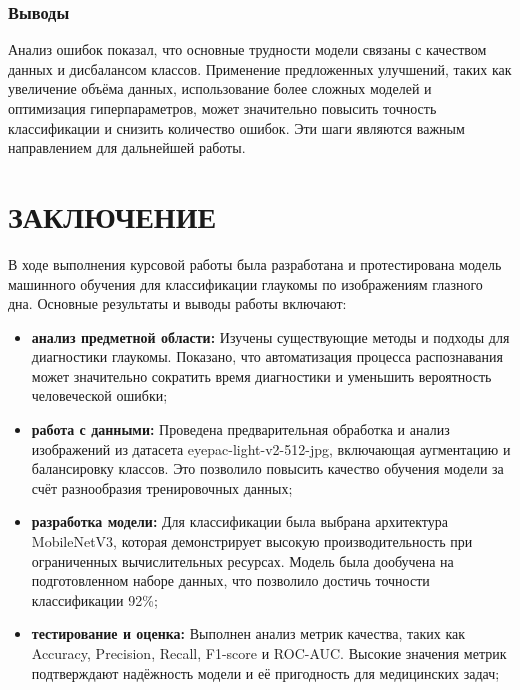 {    \subsubsection*{Выводы}

    Анализ ошибок показал, что основные трудности модели связаны с качеством данных и дисбалансом классов. Применение предложенных улучшений, таких как увеличение объёма данных, использование более сложных моделей и оптимизация гиперпараметров, может значительно повысить точность классификации и снизить количество ошибок. Эти шаги являются важным направлением для дальнейшей работы.


\newpage
\section*{ЗАКЛЮЧЕНИЕ}

    В ходе выполнения курсовой работы была разработана и протестирована модель машинного обучения для классификации глаукомы по изображениям глазного дна. Основные результаты и выводы работы включают:

    \begin{itemize}
        \item \textbf{анализ предметной области:} Изучены существующие методы и подходы для диагностики глаукомы. Показано, что автоматизация процесса распознавания может значительно сократить время диагностики и уменьшить вероятность человеческой ошибки;
        
        \item \textbf{работа с данными:} Проведена предварительная обработка и анализ изображений из датасета eyepac-light-v2-512-jpg, включающая аугментацию и балансировку классов. Это позволило повысить качество обучения модели за счёт разнообразия тренировочных данных;

        \item \textbf{разработка модели:} Для классификации была выбрана архитектура \\ MobileNetV3, которая демонстрирует высокую производительность при ограниченных вычислительных ресурсах. Модель была дообучена на подготовленном наборе данных, что позволило достичь точности классификации 92\%;

        \item \textbf{тестирование и оценка:} Выполнен анализ метрик качества, таких как Accuracy, Precision, Recall, F1-score и ROC-AUC. Высокие значения метрик подтверждают надёжность модели и её пригодность для медицинских задач;


\end{itemize}}
